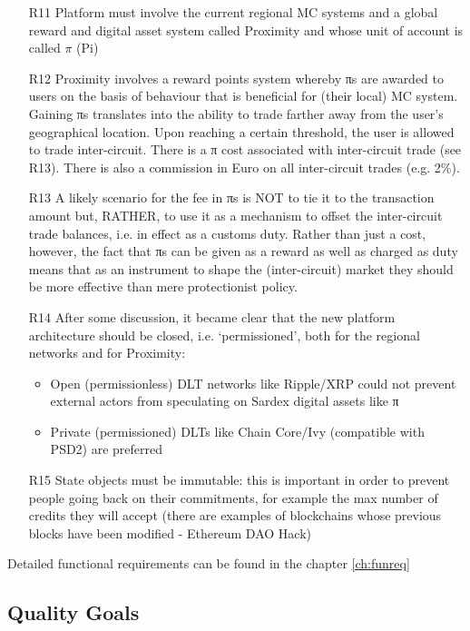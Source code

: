 \begin{itemize}
\item[R11] Platform must involve the current regional MC systems and a global reward and digital asset system called Proximity and whose unit of account is called $\pi $ (Pi)

\item[R12] {Proximity involves a reward points system whereby πs are awarded to users on the basis of behaviour that is beneficial for (their local) MC system. Gaining πs translates into the ability to trade farther away from the user’s geographical location. Upon reaching a certain threshold, the user is allowed to trade inter-circuit. There is a π cost associated with inter-circuit trade (see R13). There is also a commission in Euro on all inter-circuit trades (e.g. 2\%).}

\item[R13] A likely scenario for the fee in πs is NOT to tie it to the transaction amount but, RATHER, to use it as a mechanism to offset the inter-circuit trade balances, i.e. in effect as a customs duty. Rather than just a cost, however, the fact that πs can be given as a reward as well as charged as duty means that as an instrument to shape the (inter-circuit) market they should be more
effective than mere protectionist policy.

\item[R14] After some discussion, it became clear that the new platform architecture should be closed, i.e. ‘permissioned’, both for the regional networks and for Proximity:
\begin{itemize}
	\item Open (permissionless) DLT networks like Ripple/XRP could not prevent external actors
from speculating on Sardex digital assets like π
	\item Private (permissioned) DLTs like Chain Core/Ivy (compatible with PSD2) are preferred
\end{itemize}


\item[R15] State objects must be immutable: this is important in order to prevent people going back on their commitments, for example the max number of credits they will accept (there are examples of blockchains whose previous blocks have been modified - Ethereum DAO Hack)

\end{itemize}

Detailed functional requirements can be found in the chapter \ref{ch:funreq}

\subsection{Quality Goals}\label{_quality_goals}

